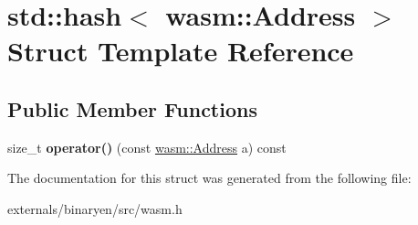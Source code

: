 \hypertarget{structstd_1_1hash_3_01wasm_1_1_address_01_4}{}\section{std\+:\+:hash$<$ wasm\+:\+:Address $>$ Struct Template Reference}
\label{structstd_1_1hash_3_01wasm_1_1_address_01_4}
\subsection*{Public Member Functions}
\begin{DoxyCompactItemize}
\item 
\mbox{\label{structstd_1_1hash_3_01wasm_1_1_address_01_4_afe13fbb4abff2c844d5cc52df272137d}} 
size\+\_\+t {\bfseries operator()} (const \mbox{\hyperlink{structwasm_1_1_address}{wasm\+::\+Address}} a) const
\end{DoxyCompactItemize}


The documentation for this struct was generated from the following file\+:\begin{DoxyCompactItemize}
\item 
externals/binaryen/src/wasm.\+h\end{DoxyCompactItemize}
